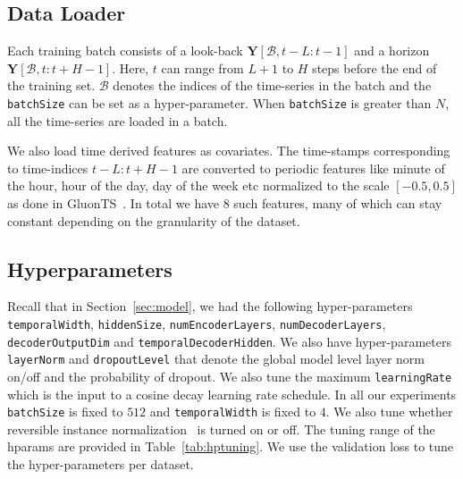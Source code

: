 \documentclass[10pt]{article} \usepackage[accepted]{tmlr}
\theoremstyle{plain}
\theoremstyle{definition}
\theoremstyle{remark}
\newcommand{\bY}{\bm{{Y}}}
\newcommand{\cB}{\mathcal{B}}
\begin{document}
\subsection{Data Loader}
\label{app:data}
Each training batch consists of a look-back $\bY[\cB, t-L:t-1]$ and a horizon $\bY[\cB, t:t+H-1]$. Here, $t$ can range from $L+1$ to $H$ steps before the end of the training set. $\cB$ denotes the indices of the time-series in the batch and the \texttt{batchSize} can be set as a hyper-parameter. When \texttt{batchSize} is greater than $N$, all the time-series are loaded in a batch.

We also load time derived features as covariates. The time-stamps corresponding to time-indices $t - L : t+H-1$ are converted to periodic features like minute of the hour, hour of the day, day of the week etc normalized to the scale $[-0.5, 0.5]$ as done in GluonTS~\citep{alexandrov2020gluonts}. In total we have 8 such features, many of which can stay constant depending on the granularity of the dataset.

\subsection{Hyperparameters}
\label{app:params}

Recall that in Section~\ref{sec:model}, we had the following hyper-parameters \texttt{temporalWidth}, \texttt{hiddenSize}, \texttt{numEncoderLayers}, \texttt{numDecoderLayers}, \texttt{decoderOutputDim} and \texttt{temporalDecoderHidden}. We also have hyper-parameters \texttt{layerNorm} and \texttt{dropoutLevel} that denote the global model level layer norm on/off and the probability of dropout. We also tune the maximum \texttt{learningRate} which is the input to a cosine decay learning rate schedule. In all our experiments \texttt{batchSize} is fixed to $512$ and \texttt{temporalWidth} is fixed to $4$. We also tune whether reversible instance normalization~\citep{kim2021reversible} is turned on or off. The tuning range of the hparams are provided in Table~\ref{tab:hptuning}. We use the validation loss to tune the hyper-parameters per dataset.
\end{document}
